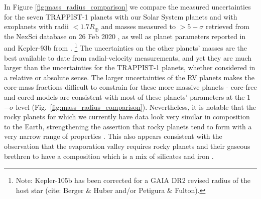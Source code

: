 \documentclass[fleqn,usenatbib]{mnras} %
\begin{document}
In Figure \ref{fig:mass_radius_comparison} we compare the measured uncertainties for
the seven TRAPPIST-1 planets with our Solar System planets and with exoplanets
with radii ${<}1.7 R_\oplus$ and masses measured to ${>}5-\sigma$ retrieved from
the NexSci database on 26 Feb 2020 \citep{Akeson2013,Christiansen2018}, as well
as planet parameters reported in \citet{Dai2019} and Kepler-93b from \citet{Dressing2015}.
\footnote{Note: Kepler-105b has been corrected for a GAIA DR2 revised radius of
    the host star (cite: Berger \& Huber and/or Petigura \& Fulton).}   The uncertainties
on the other planets' masses are the best available to date from radial-velocity measurements, and yet they are much larger than the uncertainties for the TRAPPIST-1 planets, whether considered in
a relative or absolute sense.  The larger uncertainties of the RV planets makes the core-mass fractions difficult to constrain
for these more massive planets - core-free and cored models are consistent with most of these planets' parameters at the 1$-\sigma$ level (Fig.\ \ref{fig:mass_radius_comparison}).   Nevertheless, it is notable that the
rocky planets for which we currently have data look very similar in composition to the
Earth, strengthening the assertion that rocky planets tend to form with a very
narrow range of properties \citep{Dressing2015}.
This also appears consistent with the observation
that the evaporation valley requires rocky planets and their gaseous brethren to have 
a composition which is a mix of silicates and iron \citep{Owen2017}.
\end{document}
